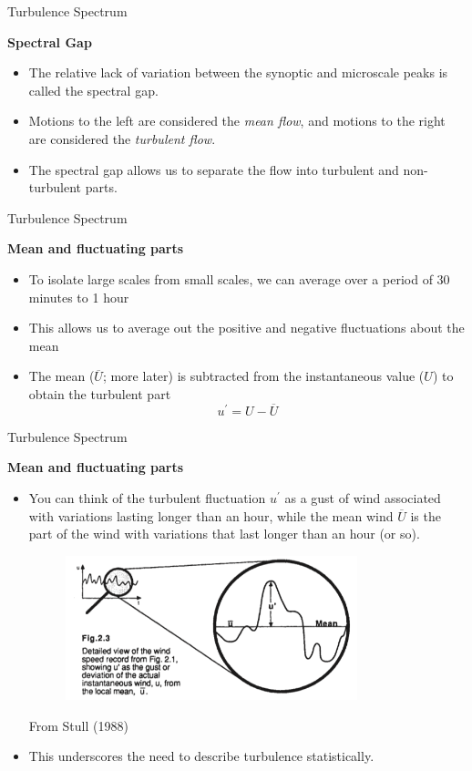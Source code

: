 \begin{frame}{Turbulence Spectrum}

\textbf{Spectral Gap}
\begin{itemize}
  	\item The relative lack of variation between the synoptic and microscale peaks is called the spectral gap.
  	\item Motions to the left are considered the \textit{mean flow}, and motions to the right are considered the \textit{turbulent flow}.
  	\item The spectral gap allows us to separate the flow into turbulent and non-turbulent parts.
  \end{itemize}
\end{frame}
\begin{frame}{Turbulence Spectrum}

\textbf{Mean and fluctuating parts}
\begin{itemize}
  	\item To isolate large scales from small scales, we can average over a period of 30 minutes to 1 hour
  	\item This allows us to average out the positive and negative fluctuations about the mean
  	\item The mean ($\overline{U}$; more later) is subtracted from the instantaneous value ($U$) to obtain the turbulent part
  	$$u^\prime = U - \overline{U}$$
  \end{itemize}
\end{frame}
\begin{frame}{Turbulence Spectrum}

\textbf{Mean and fluctuating parts}
\begin{itemize}
  	\item You can think of the turbulent fluctuation $u^\prime$ as a gust of wind associated with variations lasting longer than an hour, while the mean wind $\overline{U}$ is the part of the wind with variations that last longer than an hour (or so).
  	\begin{figure}
  		\includegraphics[width=0.8\textwidth]{turb1.png}
  	\end{figure}
  	\centering \tiny{From Stull (1988)} 
  	\item This underscores the need to describe turbulence statistically.
  \end{itemize}
\end{frame}



